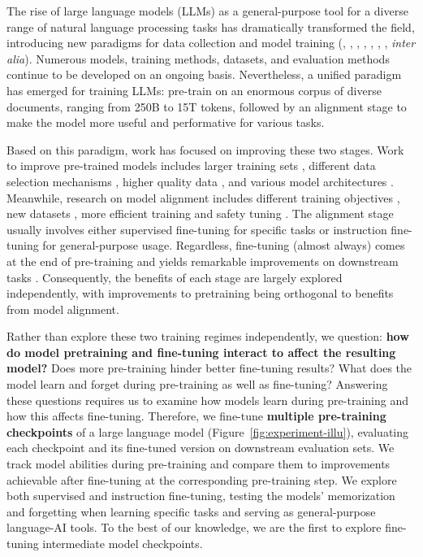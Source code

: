 


The rise of large language models (LLMs) as a general-purpose tool for a diverse range of natural language processing tasks has dramatically transformed the field, introducing new paradigms for data collection and model training 
(\citealp{brown2020language}, \citealp{biderman2023pythia}, \citealp{touvron2023llama}, 
\citealp{jiang2023mistral}, 
\citealp{chowdhery2023palm}, \citealp{groeneveld2024olmo}, \citealp{wang2024helpsteer2}, \textit{inter alia}).
Numerous models, training methods, datasets, and evaluation methods continue to be developed on an ongoing basis.
Nevertheless, a unified paradigm has emerged for training LLMs: pre-train on an enormous corpus of diverse documents, ranging from 250B \cite{biderman2023pythia} to 15T \cite{llama3modelcard} tokens, followed by an alignment stage to make the model more useful and performative for various tasks.


Based on this paradigm, work has focused on improving these two stages. 
Work to improve pre-trained models includes larger training sets \cite{hoffmann2022training, llama3modelcard, touvron2023llama}, different data selection mechanisms \cite{xia2024less}, higher quality data \cite{zhou2024lima}, and various model architectures \cite{su2024roformer, touvron2023llama}. 
Meanwhile, research on model alignment includes different training objectives \cite{rafailov2024direct, schulman2017proximal},
new datasets \cite{narayanan-aepli-2024-tulu-resource}, more efficient training \cite{hu2021lora,dettmers2024qlora} and safety tuning \cite{bianchi2023safety}. The alignment stage usually involves either supervised fine-tuning for specific tasks or instruction fine-tuning for general-purpose usage. 
Regardless, fine-tuning (almost always) comes at the end of pre-training and yields remarkable improvements on downstream tasks \cite{touvron2023llama, groeneveld2024olmo}. 
Consequently, the benefits of each stage are largely explored independently, with improvements to pretraining being orthogonal to benefits from model alignment.

Rather than explore these two training regimes independently, we question: {\bf how do model pretraining and fine-tuning interact to affect the resulting model?} Does more pre-training hinder better fine-tuning results? What does the model learn and forget during pre-training as well as fine-tuning?
Answering these questions requires us to examine how models learn during pre-training and how this affects fine-tuning. Therefore, 
we fine-tune {\bf multiple pre-training checkpoints} of a large language model (Figure~\ref{fig:experiment-illu}), evaluating each checkpoint and its fine-tuned version on downstream evaluation sets.
We track model abilities during pre-training and compare them to improvements achievable after fine-tuning at the corresponding pre-training step.
We explore both supervised and instruction fine-tuning, testing the models' memorization and forgetting when learning specific tasks and serving as general-purpose language-AI tools. 
To the best of our knowledge, we are the first to explore fine-tuning intermediate model checkpoints.

